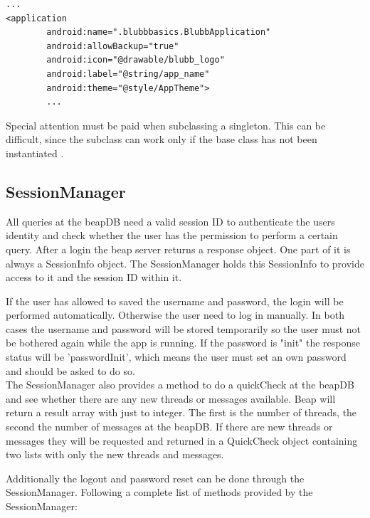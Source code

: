 \documentclass[12pt,a4paper,oneside]{report}
\newcommand{\beapDB}{beapDB}
\newcommand{\beapServer}{beap server}
\begin{document}
\lstset{language=xml}
\begin{lstlisting}[caption=Application tag of the manifest.xml, label=lst:AppTagManifest]
...
<application
        android:name=".blubbbasics.BlubbApplication"
        android:allowBackup="true"
        android:icon="@drawable/blubb_logo"
        android:label="@string/app_name"
        android:theme="@style/AppTheme">
        ...
\end{lstlisting}
\lstset{language=java}
Special attention must be paid when subclassing a singleton. This can be difficult, since the subclass can work only if the base class has not been instantiated \citep[p. 46]{cooper2000java}.

\subsection{SessionManager}
All queries at the beapDB need a valid session ID to authenticate the users identity and check whether the user has the permission to perform a certain query. After a login the \beapServer{} returns a response object. One part of it is always a SessionInfo object. The SessionManager holds this SessionInfo to provide access to it and the session ID within it.

If the user has allowed to saved the username and password, the login will be performed automatically. Otherwise the user need to log in manually. In both cases the username and password will be stored temporarily so the user must not be bothered again while the app is running. 
If the password is "init" the response status will be 'passwordInit', which means the user must set an own password and should be asked to do so. \\

The SessionManager also provides a method to do a quickCheck at the \beapDB{} and see whether there are any new threads or messages available. Beap will return a result array with just to integer. The first is the number of threads, the second the number of messages at the \beapDB{}. If there are new threads or messages they will be requested and returned in a QuickCheck object containing two lists with only the new threads and messages.


Additionally the logout and password reset can be done through the SessionManager.
Following a complete list of methods provided by the SessionManager:
\end{document}
